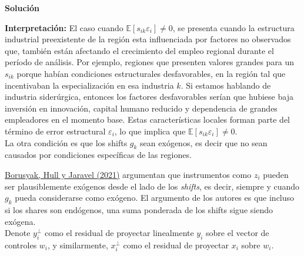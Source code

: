 \documentclass[a4paper, answers, addpoints, 11pt]{exam}
\newenvironment{solucion}{%
  \begin{mdframed}[
    backgroundcolor=blue!5,    %
    linecolor=blue!50,          %
    linewidth=2pt,              %
    leftmargin=10pt,            %
    rightmargin=8pt,           %
    topline=true,              %
    bottomline=true,            %
    roundcorner=10pt,           %
    innerleftmargin=10pt,       %
    innerrightmargin=10pt,      %
    innerbottommargin=10pt,     %
    innertopmargin=10pt         %
  ]%
  \begin{tcolorbox}[colframe=blue!50!black, colback=blue!50, coltitle=white, sharp corners=all, boxrule=1mm, width=\textwidth, halign=left, valign=center, top=0mm, bottom=0mm, left=0mm, right=0mm] \textbf{Solución} \end{tcolorbox} }{\end{mdframed}}
\begin{document}
\begin{enumerate}
\begin{itemize}
\begin{solucion}
\textbf{Interpretación:}  El caso cuando $\mathbb{E}[s_{ik}\varepsilon_i] \neq 0$, se presenta cuando la estructura industrial preexistente de la región esta influenciada por factores no observados que,  también están afectando el crecimiento del empleo regional durante el período de análisis.  Por ejemplo, regiones que presenten valores grandes para un \( s_{ik} \) porque habían condiciones estructurales desfavorables, en la región tal que incentivaban la especialización en esa industria $k$. Si estamos hablando de industria siderúrgica, entonces los factores desfavorables serían que hubiese baja inversión en innovación, capital humano reducido y dependencia de grandes empleadores en el momento base. Estas características locales forman parte del término de error estructural \( \varepsilon_i \), lo que implica que \( \mathbb{E}[s_{ik} \varepsilon_i] \ne 0 \). \\

La otra condición es que los shifts \( g_k \) sean exógenos, es decir que  no sean causados por condiciones específicas de las regiones.  \\
 
\end{solucion}

    \end{itemize}
\end{enumerate}

\href{https://academic.oup.com/restud/article-abstract/89/1/181/6294942?redirectedFrom=fulltext}{Borusyak, Hull y Jaravel (2021)} argumentan que instrumentos como $z_i$ pueden ser plausiblemente exógenos desde el lado de los \textit{shifts}, es decir, siempre y cuando $g_k$ pueda considerarse como exógeno. El argumento de los autores es que incluso si los shares son endógenos, una suma ponderada de los shifts sigue siendo exógena. \\

Denote $y^{\perp}_{i}$ como el residual de proyectar linealmente $y_i$ sobre el vector de controles $w_i$, y similarmente, $x^{\perp}_{i}$ como el residual de proyectar $x_i$ sobre $w_i$. 
\end{document}
